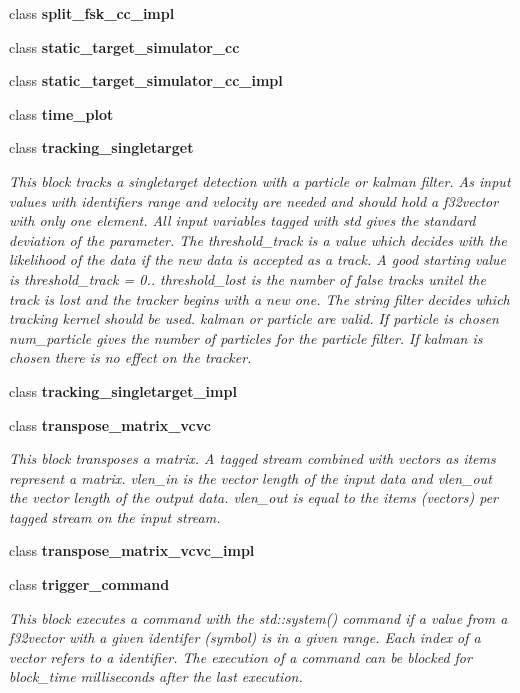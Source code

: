\begin{DoxyCompactItemize}
class {\bf split\+\_\+fsk\+\_\+cc\+\_\+impl}
\item 
class {\bf static\+\_\+target\+\_\+simulator\+\_\+cc}
\item 
class {\bf static\+\_\+target\+\_\+simulator\+\_\+cc\+\_\+impl}
\item 
class {\bf time\+\_\+plot}
\item 
class {\bf tracking\+\_\+singletarget}
\begin{DoxyCompactList}\small\item\em This block tracks a singletarget detection with a particle or kalman filter. As input values with identifiers \textquotesingle{}range\textquotesingle{} and \textquotesingle{}velocity\textquotesingle{} are needed and should hold a f32vector with only one element. All input variables tagged with std gives the standard deviation of the parameter. The threshold\+\_\+track is a value which decides with the likelihood of the data if the new data is accepted as a track. A good starting value is threshold\+\_\+track = 0.. threshold\+\_\+lost is the number of false tracks unitel the track is lost and the tracker begins with a new one. The string filter decides which tracking kernel should be used. \textquotesingle{}kalman\textquotesingle{} or \textquotesingle{}particle\textquotesingle{} are valid. If \textquotesingle{}particle\textquotesingle{} is chosen num\+\_\+particle gives the number of particles for the particle filter. If \textquotesingle{}kalman\textquotesingle{} is chosen there is no effect on the tracker. \end{DoxyCompactList}\item 
class {\bf tracking\+\_\+singletarget\+\_\+impl}
\item 
class {\bf transpose\+\_\+matrix\+\_\+vcvc}
\begin{DoxyCompactList}\small\item\em This block transposes a matrix. A tagged stream combined with vectors as items represent a matrix. vlen\+\_\+in is the vector length of the input data and vlen\+\_\+out the vector length of the output data. vlen\+\_\+out is equal to the items (vectors) per tagged stream on the input stream. \end{DoxyCompactList}\item 
class {\bf transpose\+\_\+matrix\+\_\+vcvc\+\_\+impl}
\item 
class {\bf trigger\+\_\+command}
\begin{DoxyCompactList}\small\item\em This block executes a command with the std\+::system() command if a value from a f32vector with a given identifer (symbol) is in a given range. Each index of a vector refers to a identifier. The execution of a command can be blocked for block\+\_\+time milliseconds after the last execution. \end{DoxyCompactList}\item 

\end{DoxyCompactItemize}
